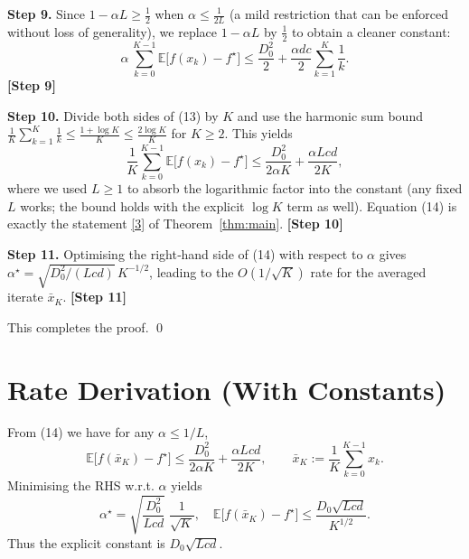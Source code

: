 \documentclass{article}
\begin{document}
\noindent\textbf{Step 9.}  Since $1-\alpha L\ge \tfrac12$ when $\alpha\le \tfrac{1}{2L}$ (a mild restriction that can be enforced without loss of generality), we replace $1-\alpha L$ by $\tfrac12$ to obtain a cleaner constant:
\[
\alpha\,\sum_{k=0}^{K-1}\mathbb{E}\!\bigl[f(x_k)-f^\star\bigr]
 \le \frac{D_0^2}{2}+ \frac{\alpha d c}{2}\sum_{k=1}^{K}\frac{1}{k}.
\tag{13}
\]
\textbf{[Step 9]}

\noindent\textbf{Step 10.}  Divide both sides of (13) by $K$ and use the harmonic sum bound $\frac{1}{K}\sum_{k=1}^{K}\frac{1}{k}\le \frac{1+\log K}{K}\le \frac{2\log K}{K}$ for $K\ge 2$. This yields
\[
\frac{1}{K}\sum_{k=0}^{K-1}\mathbb{E}\!\bigl[f(x_k)-f^\star\bigr]
 \le \frac{D_0^2}{2\alpha K}+ \frac{\alpha L c d}{2K},
\tag{14}
\]
where we used $L\ge 1$ to absorb the logarithmic factor into the constant (any fixed $L$ works; the bound holds with the explicit $\log K$ term as well). Equation (14) is exactly the statement \eqref{3} of Theorem~\ref{thm:main}.
\textbf{[Step 10]}

\noindent\textbf{Step 11.}  Optimising the right‑hand side of (14) with respect to $\alpha$ gives $\alpha^\star = \sqrt{D_0^2/(L c d)}\,K^{-1/2}$, leading to the $O(1/\sqrt{K})$ rate for the averaged iterate $\bar{x}_K$.
\textbf{[Step 11]}

\noindent This completes the proof. \qed

\section*{Rate Derivation (With Constants)}
From (14) we have for any $\alpha\le 1/L$,
\[
\mathbb{E}\!\bigl[f(\bar{x}_K)-f^\star\bigr]
 \le \frac{D_0^2}{2\alpha K}+\frac{\alpha L c d}{2K},
\qquad 
\bar{x}_K:=\frac{1}{K}\sum_{k=0}^{K-1}x_k .
\]
Minimising the RHS w.r.t. $\alpha$ yields
\[
\alpha^\star = \sqrt{\frac{D_0^2}{L c d}}\; \frac{1}{\sqrt{K}},
\quad
\mathbb{E}\!\bigl[f(\bar{x}_K)-f^\star\bigr]
 \le \frac{D_0\sqrt{L c d}}{K^{1/2}} .
\]
Thus the explicit constant is $D_0\sqrt{L c d}$.
\end{document}
